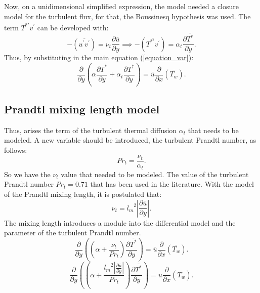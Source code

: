 \documentclass[10pt]{article} %
\begin{document}
Now, on a unidimensional simplified expression, the model needed a closure model for the turbulent flux, for that, the Boussinesq hypothesis was used. The term $\overline{T^{\ast\prime}  v^\prime}$ 
can be developed with:
\begin{equation}\label{bou}
-\left(\overline{ u^\prime  v^\prime}\right) = 
\nu_t \frac{\partial{\overline{u}}}{\partial{y}}
\implies
-\left(\overline{ T^{\ast\prime}  v^\prime}\right) = 
\alpha_t \frac{\partial{\overline{T^\ast}}}{\partial{y}}.
\end{equation}
Thus, by substituting in the main equation (\ref{equation_var}):
\\
\begin{equation}
{\frac{\partial{}}{\partial{y}}} \left(\alpha {\frac{\partial{\overline{T^\ast}}}{\partial{y}}}   
+ \alpha_t  \frac{\partial \overline{T^\ast}}{\partial y} \right)
= 
\overline{u}\frac{\partial{}}{\partial{x}}\left(\overline{T_w}\right) . 
\end{equation}

\subsection{Prandtl mixing length model} 

Thus, arises the term of the turbulent thermal diffusion $\alpha_t$ that needs to be modeled. A new variable should be introduced, the turbulent Prandtl number, as follows:
\begin{equation}
Pr_t = \frac{\nu_t}{\alpha_t}.
\end{equation} 
So we have the $ \nu_t $ value that needed to be modeled. The value of the turbulent Prandtl number $ Pr_t = 0.71 $ that has been used in the literature.
With the model of the Prandtl mixing length, it is postulated that:
\begin{equation}
\nu_t = {l_m}^2 \left| \frac{\partial \overline{u}}{\partial y} \right|.
\end{equation}
The mixing length introduces a module into the differential model and the parameter of the turbulent Prandtl number.
\\
\begin{equation}
{\frac{\partial{}}{\partial{y}}} \left( \left( \alpha   
+ \frac{\nu_t}{Pr_t} \right) \frac{\partial \overline{T^\ast}}{\partial y} \right)
= 
\overline{u}\frac{\partial{}}{\partial{x}}\left(\overline{T_w}\right)  .
\end{equation}
\begin{equation}
{\frac{\partial{}}{\partial{y}}} \left( \left( \alpha   
+ \frac{{l_m}^2 \left| \frac{\partial \overline{u}}{\partial y} \right|}{Pr_t} \right) \frac{\partial \overline{T^\ast}}{\partial y} \right)
= 
\overline{u}\frac{\partial{}}{\partial{x}}\left(\overline{T_w}\right)  .
\end{equation}
\\
\end{document}
